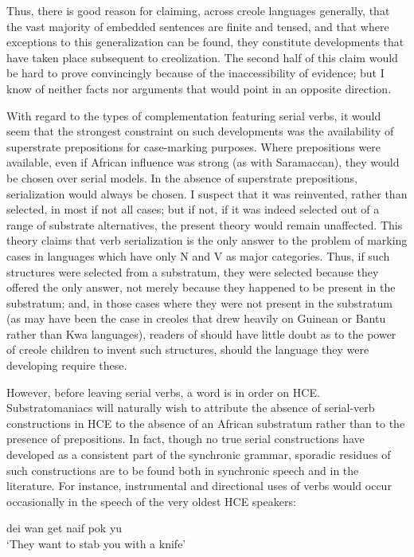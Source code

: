 Thus, there is good reason for claiming, across creole languages generally, that the vast majority of embedded sentences are finite and tensed, and that where exceptions to this generalization can be found, they constitute developments that have taken place subsequent to creolization. The second half of this claim would be hard to prove convincingly because of the inaccessibility of evidence; but I know of neither facts nor arguments that would point in an opposite direction.

With regard to the types of complementation featuring serial verbs, it would seem that the strongest constraint on such developments was the availability of superstrate prepositions for case-marking purposes. Where prepositions were available, even if African influence was strong (as with Saramaccan), they would be chosen over serial models. In the absence of superstrate prepositions, serialization would always be chosen. I suspect that it was reinvented, rather than selected,
in most if not all cases; but if not, if it was indeed selected out of a range of substrate alternatives, the present theory would remain unaffected. This theory claims that verb serialization is the only answer to the problem of marking cases in languages which have only N and V as major categories. Thus, if such structures were selected from a substratum, they were selected because they offered the only answer, not merely because they happened to be present in the substratum; and, in those cases where they were not present in the substratum (as may have been the case in creoles that drew heavily on Guinean or Bantu rather than Kwa languages), readers of  should have little doubt as to the power of creole children to invent such structures, should the language they were developing require these.

However, before leaving serial verbs, a word is in order on HCE. Substratomaniacs will naturally wish to attribute the absence of serial-verb constructions in HCE to the absence of an African substratum rather than to the presence of prepositions. In fact, though no true serial constructions have developed as a consistent part of the synchronic grammar, sporadic residues of such constructions are to be found both in synchronic speech and in the literature. For instance, instrumental and directional uses of verbs would occur occasionally in the speech of the very oldest HCE speakers:

\ea\label{ex:2:263}
dei wan get naif pok yu\\
\glt `They want to stab you with a knife'
\z

